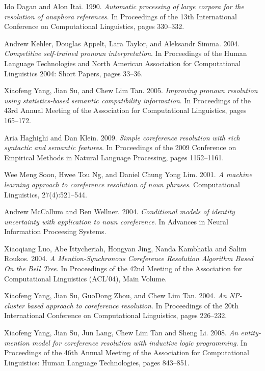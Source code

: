 \documentclass[12pt]{extarticle}
\begin{document}
\begin{thebibliography}{30}
	Ido Dagan and Alon Itai. 1990.
	\textit{Automatic processing of large corpora for the resolution of anaphora references}.
	In Proceedings of the 13th International Conference on Computational Linguistics, pages 330–332.

	Andrew Kehler, Douglas Appelt, Lara Taylor, and Aleksandr Simma. 2004.
	\textit{Competitive self-trained pronoun interpretation}.
	In Proceedings of the Human Language Technologies and North American Association for Computational Linguistics 2004: Short Papers, pages 33–36.

	Xiaofeng Yang, Jian Su, and Chew Lim Tan. 2005.
	\textit{Improving pronoun resolution using statistics-based semantic compatibility information}.
	In Proceedings of the 43rd Annual Meeting of the Association for Computational Linguistics, pages 165–172.

	Aria Haghighi and Dan Klein. 2009.
	\textit{Simple coreference resolution with rich syntactic and semantic features}.
	In Proceedings of the 2009 Conference on Empirical Methods in Natural Language Processing, pages 1152–1161.

	Wee Meng Soon, Hwee Tou Ng, and Daniel Chung Yong Lim. 2001.
	\textit{A machine learning approach to coreference resolution of noun phrases}.
	Computational Linguistics, 27(4):521–544.

	Andrew McCallum and Ben Wellner. 2004.
	\textit{Conditional models of identity uncertainty with application to noun coreference}.
	In Advances in Neural Information Proceesing Systems.

	Xiaoqiang Luo, Abe Ittycheriah, Hongyan Jing, Nanda Kambhatla and Salim Roukos. 2004.
	\textit{A Mention-Synchronous Coreference Resolution Algorithm Based On the Bell Tree}.
	In Proceedings of the 42nd Meeting of the Association for Computational Linguistics (ACL'04), Main Volume.

	Xiaofeng Yang, Jian Su, GuoDong Zhou, and Chew Lim Tan. 2004.
	\textit{An NP-cluster based approach to coreference resolution}.
	In Proceedings of the 20th International Conference on Computational Linguistics, pages 226–232.

	Xiaofeng Yang, Jian Su, Jun Lang, Chew Lim Tan and Sheng Li. 2008.
	\textit{An entity-mention model for coreference resolution with inductive logic programming}.
	In Proceedings of the 46th Annual Meeting of the Association for Computational Linguistics: Human Language Technologies, pages 843–851.


\end{thebibliography}
\end{document}
